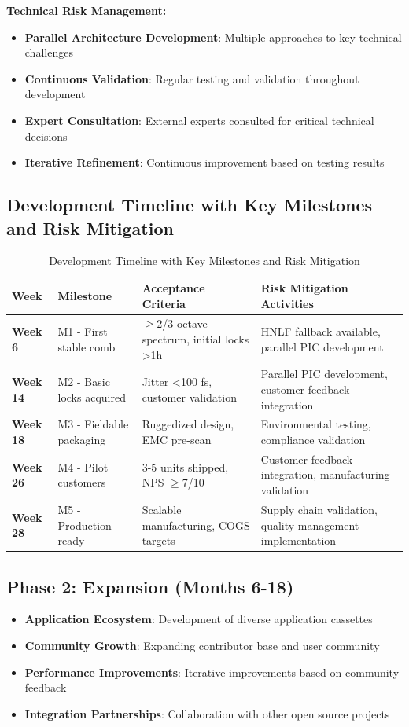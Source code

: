 \documentclass[11pt,a4paper]{article}
\begin{document}
\textbf{Technical Risk Management:}
\begin{itemize}
\item \textbf{Parallel Architecture Development}: Multiple approaches to key technical challenges
\item \textbf{Continuous Validation}: Regular testing and validation throughout development
\item \textbf{Expert Consultation}: External experts consulted for critical technical decisions
\item \textbf{Iterative Refinement}: Continuous improvement based on testing results
\end{itemize}

\subsection{Development Timeline with Key Milestones and Risk Mitigation}
\begin{table}[ht]
\centering
\begin{tabular}{|p{2cm}|p{3cm}|p{4cm}|p{3cm}|}
\hline
\textbf{Week} & \textbf{Milestone} & \textbf{Acceptance Criteria} & \textbf{Risk Mitigation Activities} \\
\hline
\textbf{Week 6} & M1 - First stable comb & $\geq$2/3 octave spectrum, initial locks >1h & HNLF fallback available, parallel PIC development \\
\hline
\textbf{Week 14} & M2 - Basic locks acquired & Jitter <100 fs, customer validation & Parallel PIC development, customer feedback integration \\
\hline
\textbf{Week 18} & M3 - Fieldable packaging & Ruggedized design, EMC pre-scan & Environmental testing, compliance validation \\
\hline
\textbf{Week 26} & M4 - Pilot customers & 3-5 units shipped, NPS $\geq$7/10 & Customer feedback integration, manufacturing validation \\
\hline
\textbf{Week 28} & M5 - Production ready & Scalable manufacturing, COGS targets & Supply chain validation, quality management implementation \\
\hline
\end{tabular}
\caption{Development Timeline with Key Milestones and Risk Mitigation}
\end{table}

\subsection{Phase 2: Expansion (Months 6-18)}
\begin{itemize}
\item \textbf{Application Ecosystem}: Development of diverse application cassettes
\item \textbf{Community Growth}: Expanding contributor base and user community
\item \textbf{Performance Improvements}: Iterative improvements based on community feedback
\item \textbf{Integration Partnerships}: Collaboration with other open source projects
\end{itemize}
\end{document}
